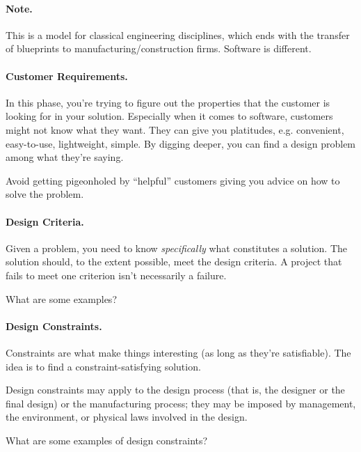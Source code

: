 \paragraph{Note.} This is a model for classical engineering
disciplines, which ends with the transfer of blueprints to
manufacturing/construction firms. Software is different.

\paragraph{Customer Requirements.} In this phase, you're trying to figure
out the properties that the customer is looking for in your solution.
Especially when it comes to software, customers might not know what
they want.  They can give you platitudes, e.g. convenient,
easy-to-use, lightweight, simple. By digging deeper, you can find a design
problem among what they're saying.

Avoid getting pigeonholed by ``helpful'' customers giving you advice on how
to solve the problem.

\paragraph{Design Criteria.} Given a problem, you need to know
\emph{specifically} what constitutes a solution. %
The solution should, to the extent possible, meet the design criteria.
A project that fails to meet one criterion isn't necessarily a failure.

{\sf What are some examples?}


\paragraph{Design Constraints.} Constraints are what make things interesting
(as long as they're satisfiable). The idea is to find a constraint-satisfying
solution.

Design constraints may apply to the design process (that is, the
designer or the final design) or the manufacturing process; they may
be imposed by management, the environment, or physical laws involved
in the design.

{\sf What are some examples of design constraints?}\\[4em]

